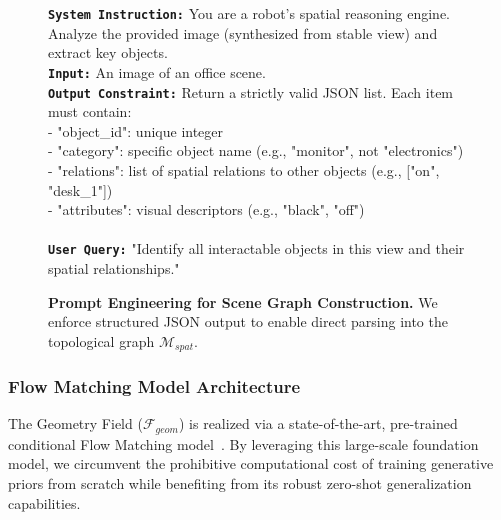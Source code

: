 \documentclass[conference]{IEEEtran}
\begin{document}
\begin{figure}[h]

\centering

\begin{tcolorbox}[colback=gray!5,colframe=gray!40,title=\textbf{VLM Prompt for Spatial Graph Generation}]

\footnotesize

\texttt{\textbf{System Instruction:}} You are a robot's spatial reasoning engine. Analyze the provided image (synthesized from stable view) and extract key objects. \\

\texttt{\textbf{Input:}} An image of an office scene. \\

\texttt{\textbf{Output Constraint:}} Return a strictly valid JSON list. Each item must contain: \\

- "object\_id": unique integer \\

- "category": specific object name (e.g., "monitor", not "electronics") \\

- "relations": list of spatial relations to other objects (e.g., ["on", "desk\_1"]) \\

- "attributes": visual descriptors (e.g., "black", "off") \\

\\

\texttt{\textbf{User Query:}} "Identify all interactable objects in this view and their spatial relationships."

\end{tcolorbox}

\caption{\textbf{Prompt Engineering for Scene Graph Construction.} We enforce structured JSON output to enable direct parsing into the topological graph $\mathcal{M}_{spat}$.}

\label{fig:prompt_engineering}

\end{figure}



\subsubsection{Flow Matching Model Architecture}

The Geometry Field ($\mathcal{F}_{geom}$) is realized via a state-of-the-art, pre-trained conditional Flow Matching model~\cite{chen2025sam}. By leveraging this large-scale foundation model, we circumvent the prohibitive computational cost of training generative priors from scratch while benefiting from its robust zero-shot generalization capabilities.
\end{document}
